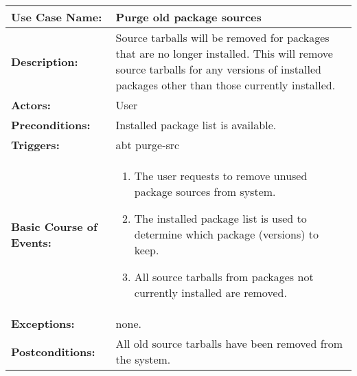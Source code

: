 
\begin{tabularx}{\linewidth}{|l|X|}
\hline
\textbf{Use Case Name:} & \textbf{Purge old package sources} \\
\hline
\textbf{Description:} & 
Source tarballs will be removed for packages that are no longer installed. 
This will remove source tarballs for any versions of installed packages other
than those currently installed. \\
\hline
\textbf{Actors:} & User \\
\hline
\textbf{Preconditions:} & Installed package list is available. \\
\hline
\textbf{Triggers:} & abt purge-src \\
\hline
\textbf{Basic Course of Events:} & 
\begin{minipage}{\linewidth} 
  \vspace{0.05em}
  \begin{enumerate}
    \item The user requests to remove unused package sources from system.
    \item The installed package list is used to determine which package (versions) to keep.
    \item All source tarballs from packages not currently installed are removed.
  \end{enumerate}
  \vspace{0.05em}
\end{minipage}
\\
\hline
\textbf{Exceptions:} & none. \\
\hline 
\textbf{Postconditions:} & All old source tarballs have been removed from the system. \\
\hline
\end{tabularx}


